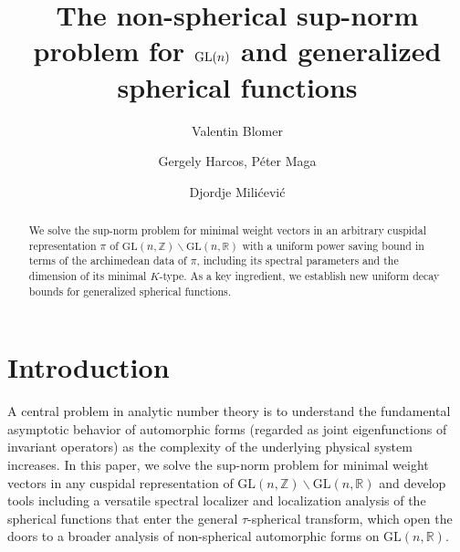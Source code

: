 \documentclass[11pt,oneside]{amsart}
\title[The non-spherical sup-norm problem for $\GL(n)$]{The non-spherical sup-norm problem for $\GL(n)$ and generalized spherical functions}
\author{Valentin Blomer}
\author{Gergely Harcos, P\'eter Maga}
\author{Djordje Mili\'cevi\'c}
\numberwithin{equation}{section}
\theoremstyle{remark}
\theoremstyle{plain}
\newcommand\GL{\mathrm{GL}}
\newcommand\ZZ{\mathbb{Z}}
\newcommand\RR{\mathbb{R}}
\newcommand\bs{\backslash}
\begin{document}
\begin{abstract}
We solve the sup-norm problem for minimal weight vectors in an arbitrary cuspidal representation $\pi $ of $\GL(n,\ZZ)\bs\GL(n,\RR)$ with a uniform power saving bound in terms of the archimedean data of $\pi$, including its spectral parameters and the dimension of its minimal $K$-type. As a key ingredient, we establish new uniform decay bounds for generalized spherical functions.
\end{abstract}

\maketitle

\section{Introduction}
A central problem in analytic number theory is to understand the fundamental asymptotic behavior of automorphic forms (regarded as joint eigenfunctions of invariant operators) as the complexity of the underlying physical system increases. In this paper, we solve the sup-norm problem for minimal weight vectors in any cuspidal representation of $\GL(n,\ZZ)\bs\GL(n,\RR)$ and develop tools including a versatile spectral localizer and localization analysis of the spherical functions that enter the general $\tau$-spherical transform, which open the doors to a broader analysis of non-spherical automorphic forms on $\GL(n,\RR)$.
\end{document}
